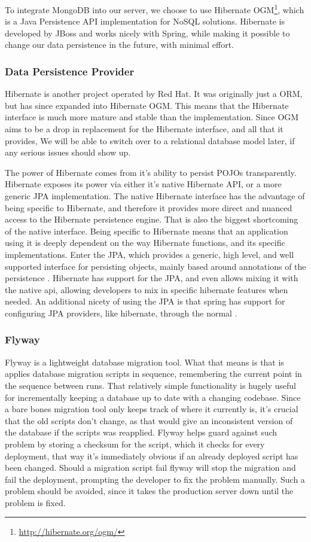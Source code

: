 \bigskip
To integrate MongoDB into our server, we choose to use Hibernate OGM\footnote{\url{http://hibernate.org/ogm/}}, which is a Java Persistence API implementation for NoSQL solutions.
Hibernate is developed by JBoss and works nicely with Spring, while making it possible to change our data persistence in the future, with minimal effort.

\subsubsection{Data Persistence Provider}
Hibernate is another project operated by Red Hat.
It was originally just a \ac{ORM}, but has since expanded into Hibernate OGM\@.
This means that the Hibernate interface is much more mature and stable than the implementation.
Since OGM aims to be a drop in replacement for the Hibernate interface, and all that it provides, We will be able to switch over to a relational database model later, if any serious issues should show up.

The power of Hibernate comes from it's ability to persist \acp{POJO} transparently.
Hibernate exposes its power via either it's native Hibernate API, or a more generic \ac{JPA} implementation.
The native Hibernate interface has the advantage of being specific to Hibernate, and therefore it provides more direct and nuanced access to the Hibernate persistence engine.
That is also the biggest shortcoming of the native interface.
Being specific to Hibernate means that an application using it is deeply dependent on the way Hibernate functions, and its specific implementations.
Enter the \ac{JPA}, which provides a generic, high level, and well supported interface for persisting objects, mainly based around annotations of the persistence .
Hibernate has support for the \ac{JPA}, and even allows mixing it with the native api, allowing developers to mix in specific hibernate features when needed.
An additional nicety of using the \ac{JPA} is that spring has support for configuring \ac{JPA} providers, like hibernate, through the normal .

\subsubsection{Flyway}
Flyway is a lightweight database migration tool.
What that means is that is applies database migration scripts in sequence, remembering the current point in the sequence between runs.
That relatively simple functionality is hugely useful for incrementally keeping a database up to date with a changing codebase.
Since a bare bones migration tool only keeps track of where it currently is, it's crucial that the old scripts don't change, as that would give an inconsistent version of the database if the scripts was reapplied.
Flyway helps guard against such problem by storing a checksum for the script, which it checks for every deployment, that way it's immediately obvious if an already deployed script has been changed.
Should a migration script fail flyway will stop the migration and fail the deployment, prompting the developer to fix the problem manually.
Such a problem should be avoided, since it takes the production server down until the problem is fixed.

